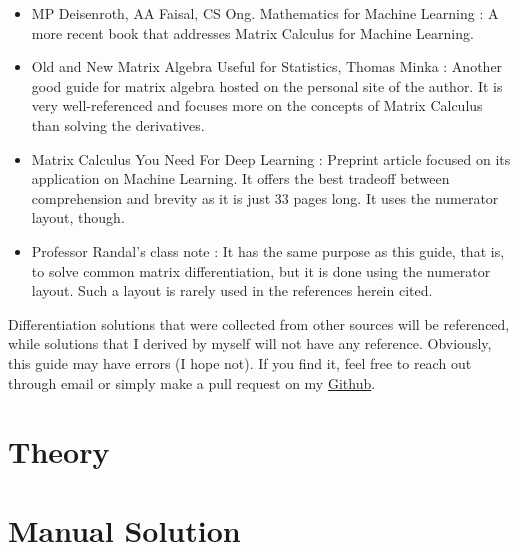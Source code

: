 \documentclass{article}
\begin{document}
\begin{itemize}
\begin{itemize}
        \item MP Deisenroth, AA Faisal, CS Ong. Mathematics for Machine Learning \cite{deisenrothMathematicsMachineLearning2020}: A more recent book that addresses Matrix Calculus for Machine Learning.
        \item Old and New Matrix Algebra Useful for Statistics, Thomas Minka \cite{ThomasMinka}: Another good guide for matrix algebra hosted on the personal site of the author. It is very well-referenced and focuses more on the concepts of Matrix Calculus than solving the derivatives.
        \item Matrix Calculus You Need For Deep Learning \cite{parrMatrixCalculusYou2018}: Preprint article focused on its application on Machine Learning. It offers the best tradeoff between comprehension and brevity as it is just 33 pages long. It uses the numerator layout, though.
        \item Professor Randal's class note \cite{barnes2006matrix}: It has the same purpose as this guide, that is, to solve common matrix differentiation, but it is done using the numerator layout. Such a layout is rarely used in the references herein cited.
\end{itemize}
\end{itemize}

Differentiation solutions that were collected from other sources will be referenced, while solutions that I derived by myself will not have any reference. Obviously, this guide may have errors (I hope not). If you find it, feel free to reach out through email or simply make a pull request on my \href{https://github.com/tapyu/tapyu.github.io/tree/master/notes/posts/matrix_diff_ref/latex}{Github}.

\part{Theory}





\part{Manual Solution}


\end{document}
